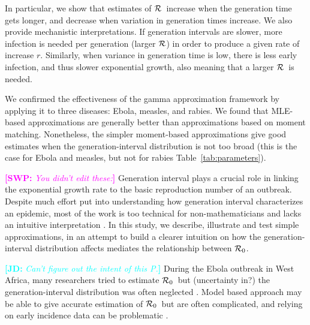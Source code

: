 \documentclass[12pt,]{article}
\newcommand{\RR}{\ensuremath{{\cal R}}}
\newcommand{\Rx}[1]{\ensuremath{{\cal R}_{#1}}}
\newcommand{\Ro}{\Rx{0}}
\newcommand{\tref}[1]{Table~\ref{tab:#1}}
\newcommand{\comment}[3]{\textcolor{#1}{\textbf{[#2: }\textit{#3}\textbf{]}}}
\newcommand{\jd}[1]{\comment{cyan}{JD}{#1}}
\newcommand{\swp}[1]{\comment{magenta}{SWP}{#1}}
\begin{document}
In particular, we show that estimates of \RR\ increase when the generation time gets longer, and decrease when variation in generation times increase. We also provide mechanistic interpretations. If generation intervals are slower, more infection is needed per generation (larger \RR)  in order to produce a given rate of increase $r$. Similarly, when variance in generation time is low, there is less early infection, and thus slower exponential growth, also meaning that a larger \RR\ is needed. 

We confirmed the effectiveness of the gamma approximation framework by applying it to three diseases: Ebola, measles, and rabies. 
We found that MLE-based approximations are generally better than approximations based on moment matching. Nonetheless, the simpler moment-based approximations give good estimates when the generation-interval distribution is not too broad (this is the case for Ebola and measles, but not for rabies \tref{parameters}).

\swp{You didn't edit these:}
Generation interval plays a crucial role in linking the exponential growth rate to the basic reproduction number of an outbreak.
Despite much effort put into understanding how generation interval characterizes an epidemic, most of the work is too technical for non-mathematicians and lacks an intuitive interpretation \cite{WallLips07,Sven07,Sven15,Nish10}.
In this study, we describe, illustrate and test simple approximations, in an attempt to build  a clearer intuition on how the generation-interval distribution affects mediates the relationship between \Ro.

\jd{Can't figure out the intent of this P.}
During the Ebola outbreak in West Africa, many researchers tried to estimate \Ro\ but (uncertainty in?) the generation-interval distribution was often neglected \cite{Alth14, OtherFastResponders}.
Model based approach may be able to give accurate estimation of \Ro\ but are often complicated, and relying on early incidence data can be problematic \cite{TaylDush16}.
\end{document}
